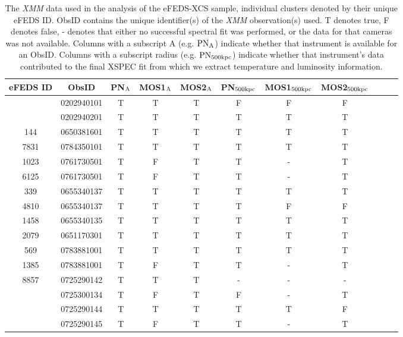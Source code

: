 \documentclass[fleqn,usenatbib]{mnras}
\begin{document}
\begin{table}
\begin{center}
\caption{{The {\em XMM} data used in the analysis of the eFEDS-XCS sample, individual clusters denoted by their unique eFEDS ID. ObsID contains the unique identifier(s) of the {\em XMM} observation(s) used. T denotes true, F denotes false, - denotes that either no successful spectral fit was performed, or the data for that cameras was not available. Columns with a subscript A (e.g. $\rm{PN}_{\rm{A}}$) indicate whether that instrument is available for an ObsID. Columns with a subscript radius (e.g. $\rm{PN}_{\rm{500kpc}}$) indicate whether that instrument's data contributed to the final XSPEC fit from which we extract temperature and luminosity information.}\label{tab:xmmobs}}
\vspace{1mm}
\begin{tabular}{ccccccccccc}
\hline
\hline
eFEDS ID & ObsID & PN$_{\rm{A}}$ & MOS1$_{\rm{A}}$ & MOS2$_{\rm{A}}$ & PN$_{\rm{500kpc}}$ & MOS1$_{\rm{500kpc}}$ & MOS2$_{\rm{500kpc}}$\\
\hline
\hline
\multirow{2}{4em}{\centering 6605} & 0202940101 & T & T & T & F & F & F \\ & 0202940201 & T & T & T & T & T & T \\ 
\hline
144 & 0650381601 & T & T & T & T & T & T \\ 
\hline
7831 & 0784350101 & T & T & T & T & T & T \\ 
\hline
1023 & 0761730501 & T & F & T & T & - & T \\ 
\hline
6125 & 0761730501 & T & F & T & T & - & T \\ 
\hline
339 & 0655340137 & T & T & T & T & T & T \\ 
\hline
4810 & 0655340137 & T & T & T & T & F & F \\ 
\hline
1458 & 0655340135 & T & T & T & T & T & T \\ 
\hline
2079 & 0651170301 & T & T & T & T & T & T \\ 
\hline
569 & 0783881001 & T & T & T & T & T & T \\ 
\hline
1385 & 0783881001 & T & F & T & T & - & T \\ 
\hline
8857 & 0725290142 & T & T & T & - & - & - \\ 
\hline
\multirow{3}{4em}{\centering 3171} & 0725300134 & T & F & T & F & - & T \\ & 0725290144 & T & T & T & T & T & F \\ & 0725290145 & T & F & T & T & - & T \\ 

\end{tabular}
\end{center}
\end{table}
\end{document}

